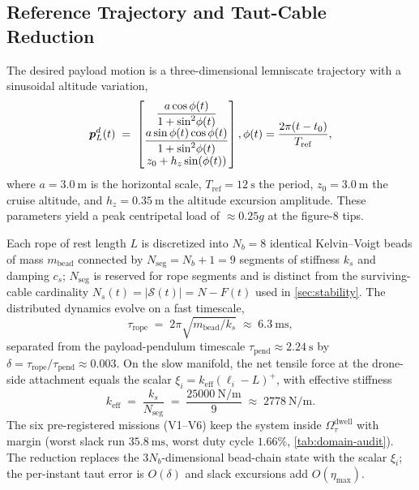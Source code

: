 \subsection{Reference Trajectory and Taut-Cable Reduction}
\label{sec:reduction-and-reference}

The desired payload motion is a three-dimensional lemniscate trajectory with a sinusoidal altitude variation,
\begin{align}
  \label{eq:lemniscate}
  \boldsymbol{p}_L^d(t) \;=\;
    \begin{bmatrix}
      \dfrac{a\cos\phi(t)}{1 + \sin^2\!\phi(t)} \\[6pt]
      \dfrac{a\sin\phi(t)\cos\phi(t)}{1 + \sin^2\!\phi(t)} \\[6pt]
 z_0 + h_z\sin(\phi(t))
    \end{bmatrix},
  \phi(t) = \frac{2\pi(t - t_0)}{T_{\mathrm{ref}}},
\end{align}
where $a = \SI{3.0}{\metre}$ is the horizontal scale, $T_{\mathrm{ref}} = \SI{12}{\second}$ the period, $z_0 = \SI{3.0}{\metre}$ the cruise altitude, and $h_z = \SI{0.35}{\metre}$ the altitude excursion amplitude. These parameters yield a peak centripetal load of $\approx 0.25g$ at the figure-8 tips.

Each rope of rest length $L$ is discretized into $N_b = 8$ identical Kelvin--Voigt beads of mass $m_{\mathrm{bead}}$ connected by $N_{\mathrm{seg}} = N_b + 1 = 9$ segments of stiffness $k_s$ and damping $c_s$; $N_{\mathrm{seg}}$ is reserved for rope segments and is distinct from the surviving-cable cardinality $N_s(t) = |\mathcal{S}(t)| = N - F(t)$ used in \cref{sec:stability}. The distributed dynamics evolve on a fast timescale,
\begin{equation}
  \tau_{\mathrm{rope}}
    \;=\; 2\pi\sqrt{m_{\mathrm{bead}}/k_s}
    \;\approx\; \SI{6.3}{\milli\second},
  \label{eq:tau-rope}
\end{equation}
separated from the payload-pendulum timescale $\tau_{\mathrm{pend}} \approx \SI{2.24}{\second}$ by $\delta = \tau_{\mathrm{rope}} / \tau_{\mathrm{pend}} \approx 0.003$. On the slow manifold, the net tensile force at the drone-side attachment equals the scalar $\xi_i = k_{\mathrm{eff}}(\ell_i - L)^+$, with effective stiffness
\begin{equation}
 k_{\mathrm{eff}}
    \;=\; \frac{k_s}{N_{\mathrm{seg}}}
    \;=\; \frac{\SI{25000}{\newton\per\metre}}{9}
    \;\approx\; \SI{2778}{\newton\per\metre}.
  \label{eq:keff}
\end{equation}
The six pre-registered missions (V1--V6) keep the system inside $\Omega_\tau^{\mathrm{dwell}}$ with margin (worst slack run $\SI{35.8}{\milli\second}$, worst duty cycle $1.66\%$, \cref{tab:domain-audit}). The reduction replaces the $3N_b$-dimensional bead-chain state with the scalar $\xi_i$; the per-instant taut error is $O(\delta)$ and slack excursions add $O(\eta_{\max})$.

